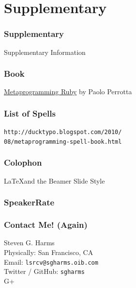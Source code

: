 \documentclass[slidestop,compress,mathserif]{beamer}
\begin{document}



\section{Supplementary} %
\label{sec:supplementary}

\begin{frame}
	\frametitle{Supplementary}
	\begin{center}
		Supplementary Information
	\end{center}
\end{frame}

\begin{frame}
	\frametitle{Book}
	\underline{Metaprogramming Ruby} by Paolo Perrotta
\end{frame}

\begin{frame}
	\frametitle{List of Spells}
	\texttt{http://ducktypo.blogspot.com/2010/\\08/metaprogramming-spell-book.html}
\end{frame}

\begin{frame}
	\frametitle{Colophon}
	\LaTeX and the Beamer Slide Style
\end{frame}

\begin{frame}
	\frametitle{SpeakerRate}
	\vskip 1.25cm
\end{frame}

\begin{frame}
	\frametitle{Contact Me! (Again)}
	\begin{center}
		Steven G. Harms \\
		\vskip 1.25cm	
		Physically:  San Francisco, CA\\
		Email:  \texttt{lsrcv@sgharms.oib.com} \\
		Twitter / GitHub:  \texttt{sgharms} \\
		G+
	\end{center}
\end{frame}
\end{document}
